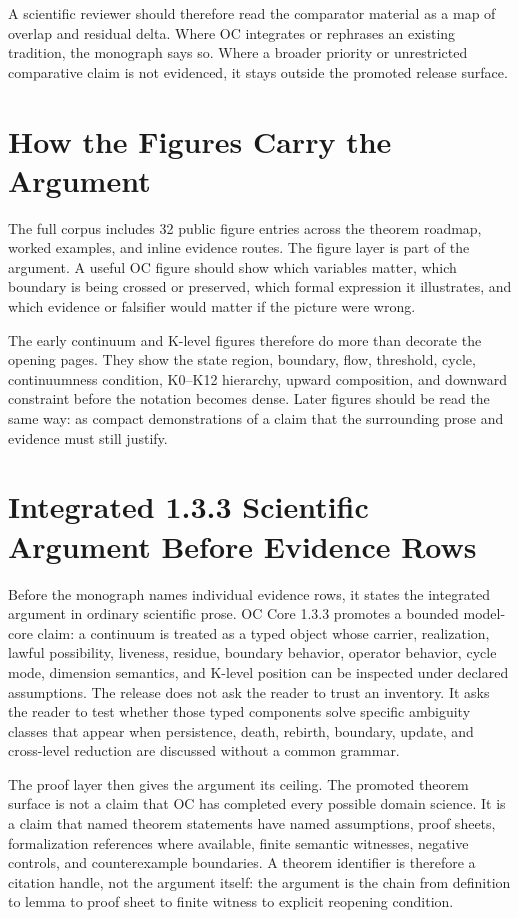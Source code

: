 A scientific reviewer should therefore read the comparator material as a map of overlap and residual delta. Where OC integrates or rephrases an existing tradition, the monograph says so. Where a broader priority or unrestricted comparative claim is not evidenced, it stays outside the promoted release surface.


\section{How the Figures Carry the Argument}
\label{sec:oc133-figure-route-design-logic}
The full corpus includes 32 public figure entries across the theorem roadmap, worked examples, and inline evidence routes. The figure layer is part of the argument. A useful OC figure should show which variables matter, which boundary is being crossed or preserved, which formal expression it illustrates, and which evidence or falsifier would matter if the picture were wrong.

The early continuum and K-level figures therefore do more than decorate the opening pages. They show the state region, boundary, flow, threshold, cycle, continuumness condition, K0--K12 hierarchy, upward composition, and downward constraint before the notation becomes dense. Later figures should be read the same way: as compact demonstrations of a claim that the surrounding prose and evidence must still justify.


\section{Integrated 1.3.3 Scientific Argument Before Evidence Rows}
\label{sec:oc133-integrated-argument-before-evidence-rows}
Before the monograph names individual evidence rows, it states the integrated argument in ordinary scientific prose. OC Core 1.3.3 promotes a bounded model-core claim: a continuum is treated as a typed object whose carrier, realization, lawful possibility, liveness, residue, boundary behavior, operator behavior, cycle mode, dimension semantics, and K-level position can be inspected under declared assumptions. The release does not ask the reader to trust an inventory. It asks the reader to test whether those typed components solve specific ambiguity classes that appear when persistence, death, rebirth, boundary, update, and cross-level reduction are discussed without a common grammar.

The proof layer then gives the argument its ceiling. The promoted theorem surface is not a claim that OC has completed every possible domain science. It is a claim that named theorem statements have named assumptions, proof sheets, formalization references where available, finite semantic witnesses, negative controls, and counterexample boundaries. A theorem identifier is therefore a citation handle, not the argument itself: the argument is the chain from definition to lemma to proof sheet to finite witness to explicit reopening condition.

